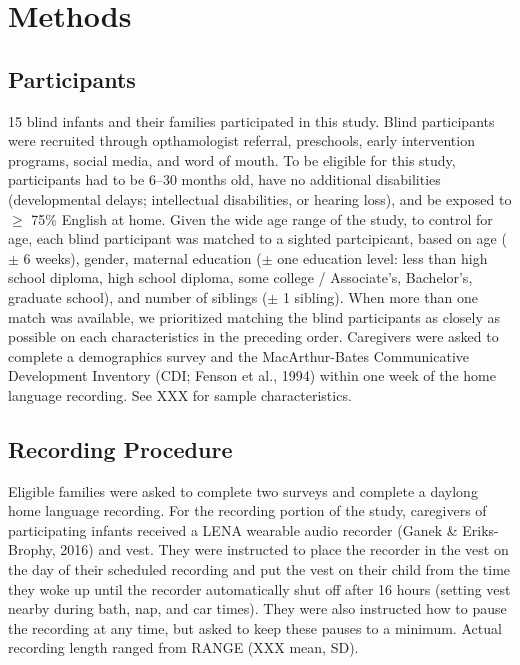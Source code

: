 \documentclass[english,man]{apa6}
\begin{document}
\hypertarget{methods}{%
\section{Methods}\label{methods}}

\hypertarget{participants}{%
\subsection{Participants}\label{participants}}

15 blind infants and their families participated in this study. Blind participants were recruited through opthamologist referral, preschools, early intervention programs, social media, and word of mouth. To be eligible for this study, participants had to be 6--30 months old, have no additional disabilities (developmental delays; intellectual disabilities, or hearing loss), and be exposed to \(\geq\) 75\% English at home. Given the wide age range of the study, to control for age, each blind participant was matched to a sighted partcipicant, based on age (\(\pm\) 6 weeks), gender, maternal education (\(\pm\) one education level: less than high school diploma, high school diploma, some college / Associate's, Bachelor's, graduate school), and number of siblings (\(\pm\) 1 sibling). When more than one match was available, we prioritized matching the blind participants as closely as possible on each characteristics in the preceding order. Caregivers were asked to complete a demographics survey and the MacArthur-Bates Communicative Development Inventory (CDI; Fenson et al., 1994) within one week of the home language recording. See XXX for sample characteristics.

\hypertarget{recording-procedure}{%
\subsection{Recording Procedure}\label{recording-procedure}}

Eligible families were asked to complete two surveys and complete a daylong home language recording. For the recording portion of the study, caregivers of participating infants received a LENA wearable audio recorder (Ganek \& Eriks-Brophy, 2016) and vest. They were instructed to place the recorder in the vest on the day of their scheduled recording and put the vest on their child from the time they woke up until the recorder automatically shut off after 16 hours (setting vest nearby during bath, nap, and car times). They were also instructed how to pause the recording at any time, but asked to keep these pauses to a minimum. Actual recording length ranged from RANGE (XXX mean, SD).
\end{document}

